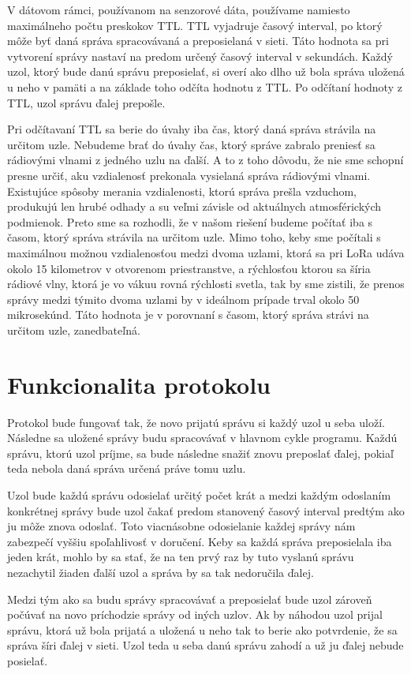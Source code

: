 \documentclass[slovak,master]{diploma}
\begin{document}
V dátovom rámci, používanom na senzorové dáta, používame namiesto maximálneho počtu preskokov TTL. TTL vyjadruje časový interval, po ktorý môže byť daná správa 
spracovávaná a preposielaná v sieti. Táto hodnota sa pri vytvorení správy nastaví na predom určený časový interval v sekundách. Každý uzol, ktorý bude danú správu preposielať, 
si overí ako dlho už bola správa uložená u neho v pamäti a na základe toho odčíta hodnotu z TTL. Po odčítaní hodnoty z TTL, uzol správu ďalej prepošle.

Pri odčítavaní TTL sa berie do úvahy iba čas, ktorý daná správa strávila na určitom uzle. Nebudeme brať do úvahy čas, ktorý správe zabralo preniesť sa rádiovými vlnami z jedného uzlu 
na ďalší. A to z toho dôvodu, že nie sme schopní presne určiť, aku vzdialenosť prekonala vysielaná správa rádiovými vlnami. Existujúce spôsoby merania vzdialenosti, 
ktorú správa prešla vzduchom, produkujú len hrubé odhady a su veľmi závisle od aktuálnych atmosférických podmienok. Preto sme sa rozhodli, že v našom riešení budeme 
počítať iba s časom, ktorý správa strávila na určitom uzle. Mimo toho, keby sme počítali s maximálnou možnou vzdialenosťou medzi dvoma uzlami, ktorá sa pri LoRa 
udáva okolo 15 kilometrov v otvorenom priestranstve, a rýchlosťou ktorou sa šíria rádiové vlny, ktorá je vo vákuu rovná rýchlosti svetla, tak by sme zistili, 
že prenos správy medzi týmito dvoma uzlami by v ideálnom prípade trval okolo 50 mikrosekúnd. Táto hodnota je v porovnaní s časom, ktorý správa strávi na určitom uzle, 
zanedbateľná.

\section{Funkcionalita protokolu}
Protokol bude fungovať tak, že novo prijatú správu si každý uzol u seba uloží. Následne sa uložené správy budu spracovávať v hlavnom cykle programu. 
Každú správu, ktorú uzol príjme, sa bude následne snažiť znovu preposlať ďalej, pokiaľ teda nebola daná správa určená práve tomu uzlu.

Uzol bude každú správu odosielať určitý počet krát a medzi každým odoslaním konkrétnej správy bude uzol čakať predom stanovený časový interval predtým ako ju môže znova odoslať.
Toto viacnásobne odosielanie každej správy nám zabezpečí vyššiu spoľahlivosť v doručení. Keby sa každá správa preposielala iba jeden krát, mohlo by sa stať, že na ten prvý raz 
by tuto vyslanú správu nezachytil žiaden ďalší uzol a správa by sa tak nedoručila ďalej.

Medzi tým ako sa budu správy spracovávať a preposielať bude uzol zároveň počúvať na novo príchodzie správy od iných uzlov. Ak by náhodou uzol 
prijal správu, ktorá už bola prijatá a uložená u neho tak to berie ako potvrdenie, že sa správa šíri ďalej v sieti. Uzol teda u seba danú správu zahodí a už ju 
ďalej nebude posielať.
\end{document}
